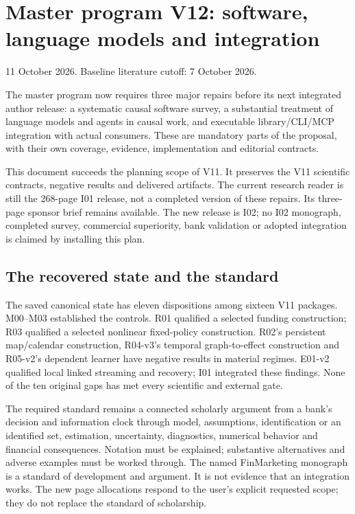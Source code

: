 \documentclass[
  11pt,
  a4paper,
]{article}
\author{}
\date{}
\begin{document}
\hypertarget{master-program-v12-software-language-models-and-integration}{%
\section{Master program V12: software, language models and
integration}\label{master-program-v12-software-language-models-and-integration}}

11 October 2026. Baseline literature cutoff: 7 October 2026.

The master program now requires three major repairs before its next
integrated author release: a systematic causal software survey, a
substantial treatment of language models and agents in causal work, and
executable library/CLI/MCP integration with actual consumers. These are
mandatory parts of the proposal, with their own coverage, evidence,
implementation and editorial contracts.

This document succeeds the planning scope of V11. It preserves the V11
scientific contracts, negative results and delivered artifacts. The
current research reader is still the 268-page I01 release, not a
completed version of these repairs. Its three-page sponsor brief remains
available. The new release is I02; no I02 monograph, completed survey,
commercial superiority, bank validation or adopted integration is
claimed by installing this plan.

\hypertarget{the-recovered-state-and-the-standard}{%
\subsection{The recovered state and the
standard}\label{the-recovered-state-and-the-standard}}

The saved canonical state has eleven dispositions among sixteen V11
packages. M00--M03 established the controls. R01 qualified a selected
funding construction; R03 qualified a selected nonlinear fixed-policy
construction. R02's persistent map/calendar construction, R04-v3's
temporal graph-to-effect construction and R05-v2's dependent learner
have negative results in material regimes. E01-v2 qualified local linked
streaming and recovery; I01 integrated these findings. None of the ten
original gaps has met every scientific and external gate.

The required standard remains a connected scholarly argument from a
bank's decision and information clock through model, assumptions,
identification or an identified set, estimation, uncertainty,
diagnostics, numerical behavior and financial consequences. Notation
must be explained; substantive alternatives and adverse examples must be
worked through. The named FinMarketing monograph is a standard of
development and argument. It is not evidence that an integration works.
The new page allocations respond to the user's explicit requested scope;
they do not replace the standard of scholarship.
\end{document}
